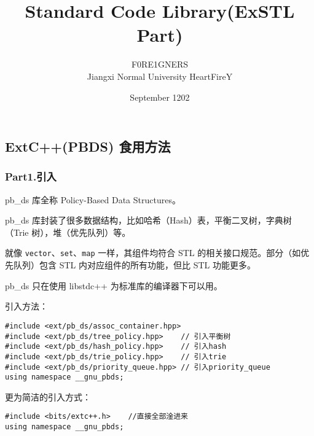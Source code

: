 \documentclass[]{article}
\date{}
\title{\vspace{50mm} \huge Standard Code Library(ExSTL Part) \\[20pt]}
\author{F0RE1GNERS \\[10pt] Jiangxi Normal University HeartFireY}
\date{September 1202}
\begin{document}
\begin{titlepage}

\maketitle

\end{titlepage}

\newpage

\renewcommand\labelitemi{$\bullet$}

{
\setcounter{tocdepth}{3}
\tableofcontents
\newpage
}








\hypertarget{extcpbds-ux98dfux7528ux65b9ux6cd5}{%
\subsection{ExtC++(PBDS)
食用方法}\label{extcpbds-ux98dfux7528ux65b9ux6cd5}}

\hypertarget{part1.ux5f15ux5165}{%
\subsubsection{Part1.引入}\label{part1.ux5f15ux5165}}

pb\_ds 库全称 Policy-Based Data Structures。

pb\_ds
库封装了很多数据结构，比如哈希（Hash）表，平衡二叉树，字典树（Trie
树），堆（优先队列）等。

就像 \texttt{vector}、\texttt{set}、\texttt{map} 一样，其组件均符合 STL
的相关接口规范。部分（如优先队列）包含 STL 内对应组件的所有功能，但比
STL 功能更多。

pb\_ds 只在使用 libstdc++ 为标准库的编译器下可以用。

引入方法：

\begin{verbatim}
#include <ext/pb_ds/assoc_container.hpp>
#include <ext/pb_ds/tree_policy.hpp>    // 引入平衡树
#include <ext/pb_ds/hash_policy.hpp>    // 引入hash
#include <ext/pb_ds/trie_policy.hpp>    // 引入trie
#include <ext/pb_ds/priority_queue.hpp> // 引入priority_queue
using namespace __gnu_pbds;
\end{verbatim}

更为简洁的引入方式：

\begin{verbatim}
#include <bits/extc++.h>    //直接全部淦进来
using namespace __gnu_pbds;
\end{verbatim}
\end{document}
